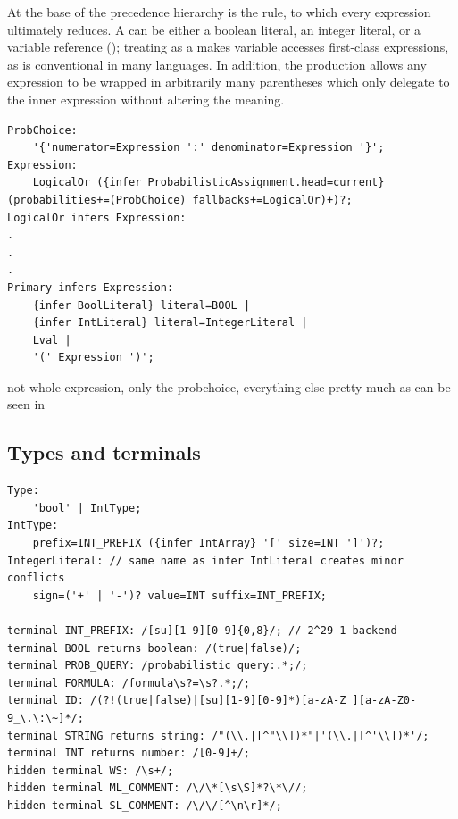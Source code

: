 At the base of the precedence hierarchy is the  rule, to which every expression ultimately reduces. A  can be either a boolean literal, an integer literal, or a variable reference (); treating  as a  makes variable accesses first-class expressions,
as is conventional in many languages. In addition, the production allows any expression to be wrapped in arbitrarily many parentheses which only delegate to the inner expression without altering the meaning.

\begin{verbatim}
ProbChoice:
    '{'numerator=Expression ':' denominator=Expression '}';
Expression:
    LogicalOr ({infer ProbabilisticAssignment.head=current} (probabilities+=(ProbChoice) fallbacks+=LogicalOr)+)?;
LogicalOr infers Expression:
.
.
.
Primary infers Expression:
    {infer BoolLiteral} literal=BOOL | 
    {infer IntLiteral} literal=IntegerLiteral |
    Lval |
    '(' Expression ')';
\end{verbatim}

not whole expression, only the probchoice, everything else pretty much as can be seen in \cite{linkToLangiumExamplpesGit}

\subsection*{Types and terminals}



\begin{verbatim}
Type:
    'bool' | IntType;
IntType:
    prefix=INT_PREFIX ({infer IntArray} '[' size=INT ']')?;
IntegerLiteral: // same name as infer IntLiteral creates minor conflicts
    sign=('+' | '-')? value=INT suffix=INT_PREFIX;

terminal INT_PREFIX: /[su][1-9][0-9]{0,8}/; // 2^29-1 backend
terminal BOOL returns boolean: /(true|false)/;
terminal PROB_QUERY: /probabilistic query:.*;/;
terminal FORMULA: /formula\s?=\s?.*;/;
terminal ID: /(?!(true|false)|[su][1-9][0-9]*)[a-zA-Z_][a-zA-Z0-9_\.\:\~]*/;
terminal STRING returns string: /"(\\.|[^"\\])*"|'(\\.|[^'\\])*'/;
terminal INT returns number: /[0-9]+/;
hidden terminal WS: /\s+/;
hidden terminal ML_COMMENT: /\/\*[\s\S]*?\*\//;
hidden terminal SL_COMMENT: /\/\/[^\n\r]*/;
\end{verbatim}

